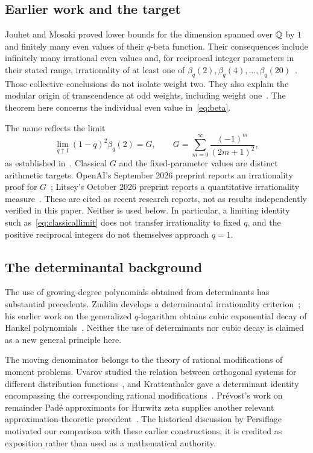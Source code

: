 \subsection{Earlier work and the target}
Jouhet and Mosaki proved lower bounds for the dimension spanned over $\mathbb Q$ by $1$ and finitely many even values of their $q$-beta function. Their consequences include infinitely many irrational even values and, for reciprocal integer parameters in their stated range, irrationality of at least one of $\beta_q(2),\beta_q(4),\ldots,\beta_q(20)$~\cite[Theorem 1.1 and Corollaries 1.2--1.3]{JM}. Those collective conclusions do not isolate weight two. They also explain the modular origin of transcendence at odd weights, including weight one~\cite[Introduction]{JM}. The theorem here concerns the individual even value in~\eqref{eq:beta}.

The name reflects the limit
\begin{equation}\label{eq:classicallimit}
 \lim_{q\uparrow1}(1-q)^2\beta_q(2)=G,
 \qquad G=\sum_{m=0}^{\infty}\frac{(-1)^m}{(2m+1)^2},
\end{equation}
as established in~\cite[Section 6.1]{JM}. Classical $G$ and the fixed-parameter values are distinct arithmetic targets. OpenAI's September 2026 preprint reports an irrationality proof for $G$~\cite{OAICatalan}; Litsey's October 2026 preprint reports a quantitative irrationality measure~\cite{Litsey}. These are cited as recent research reports, not as results independently verified in this paper. Neither is used below. In particular, a limiting identity such as~\eqref{eq:classicallimit} does not transfer irrationality to fixed $q$, and the positive reciprocal integers do not themselves approach $q=1$.

\subsection{The determinantal background}
The use of growing-degree polynomials obtained from determinants has substantial precedents. Zudilin develops a determinantal irrationality criterion~\cite{Zudilin2017}; his earlier work on the generalized $q$-logarithm obtains cubic exponential decay of Hankel polynomials~\cite[Section 4, equation (8)]{Zudilin2016}. Neither the use of determinants nor cubic decay is claimed as a new general principle here.

The moving denominator belongs to the theory of rational modifications of moment problems. Uvarov studied the relation between orthogonal systems for different distribution functions~\cite{Uvarov}, and Krattenthaler gave a determinant identity encompassing the corresponding rational modifications~\cite{Krattenthaler2021}. Pr\'evost's work on remainder Pad\'e approximants for Hurwitz zeta supplies another relevant approximation-theoretic precedent~\cite{Prevost2019}. The historical discussion by Persiflage~\cite{Persiflage} motivated our comparison with these earlier constructions; it is credited as exposition rather than used as a mathematical authority.

